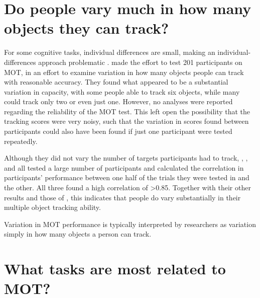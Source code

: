 \documentclass[]{book}
\begin{document}
\hypertarget{do-people-vary-much-in-how-many-objects-they-can-track}{%
\section{Do people vary much in how many objects they can track?}\label{do-people-vary-much-in-how-many-objects-they-can-track}}

For some cognitive tasks, individual differences are small, making an individual-differences approach problematic \citep{hedgeReliabilityParadoxWhy2018}. \citet{oksamaMultipleObjectTracking2004} made the effort to test 201 participants on MOT, in an effort to examine variation in how many objects people can track with reasonable accuracy. They found what appeared to be a substantial variation in capacity, with some people able to track six objects, while many could track only two or even just one. However, no analyses were reported regarding the reliability of the MOT test. This left open the possibility that the tracking scores were very noisy, such that the variation in scores found between participants could also have been found if just one participant were tested repeatedly.

Although they did not vary the number of targets participants had to track, \citet{huangMeasuringInterrelationsMultiple2012}, \citet{oksamaMultipleObjectTracking2004}, and \citet{trevinoBridgingCognitiveNeuropsychological} all tested a large number of participants and calculated the correlation in participants' performance between one half of the trials they were tested in and the other. All three found a high correlation of \textgreater{}0.85. Together with their other results and those of \citet{oksamaMultipleObjectTracking2004}, this indicates that people do vary substantially in their multiple object tracking ability.

Variation in MOT performance is typically interpreted by researchers as variation simply in how many objects a person can track.

\hypertarget{what-tasks-are-most-related-to-mot}{%
\section{What tasks are most related to MOT?}\label{what-tasks-are-most-related-to-mot}}
\end{document}
